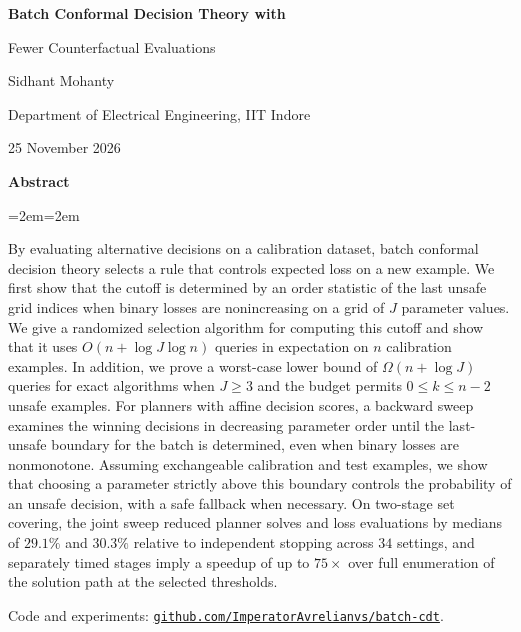 \documentclass[a4paper,10pt]{article}
\theoremstyle{plain}
\theoremstyle{remark}
\begin{document}
\thispagestyle{plain}
\vspace*{10pt}
\begin{center}
{\fontsize{17.5}{21}\selectfont\bfseries\color{paperNavy}
Batch Conformal Decision Theory with\par Fewer Counterfactual Evaluations\par}
\vspace{16pt}
{\normalsize Sidhant Mohanty\par}
\vspace{2pt}
{\small Department of Electrical Engineering, IIT Indore\par}
\vspace{5pt}
{\normalsize 25 November 2026\par}
\end{center}
\vspace{6pt}

\begin{center}\textbf{Abstract}\end{center}
\vspace{-4pt}
\begin{list}{}{\leftmargin=2em\rightmargin=2em\topsep=0pt\parsep=0pt}
\item By evaluating alternative decisions on a calibration dataset, batch conformal decision theory selects a rule that controls expected loss on a new example. We first show that the cutoff is determined by an order statistic of the last unsafe grid indices when binary losses are nonincreasing on a grid of $J$ parameter values. We give a randomized selection algorithm for computing this cutoff and show that it uses $O(n+\log J\log n)$ queries in expectation on $n$ calibration examples. In addition, we prove a worst-case lower bound of $\Omega(n+\log J)$ queries for exact algorithms when $J\ge3$ and the budget permits $0\le k\le n-2$ unsafe examples. For planners with affine decision scores, a backward sweep examines the winning decisions in decreasing parameter order until the last-unsafe boundary for the batch is determined, even when binary losses are nonmonotone. Assuming exchangeable calibration and test examples, we show that choosing a parameter strictly above this boundary controls the probability of an unsafe decision, with a safe fallback when necessary. On two-stage set covering, the joint sweep reduced planner solves and loss evaluations by medians of $29.1\%$ and $30.3\%$ relative to independent stopping across $34$ settings, and separately timed stages imply a speedup of up to $75\times$ over full enumeration of the solution path at the selected thresholds.
\end{list}
\vspace{4pt}
{\small\noindent Code and experiments: \href{https://github.com/ImperatorAvrelianvs/batch-cdt}{\texttt{github.com/ImperatorAvrelianvs/batch-cdt}}.\par}
\end{document}
